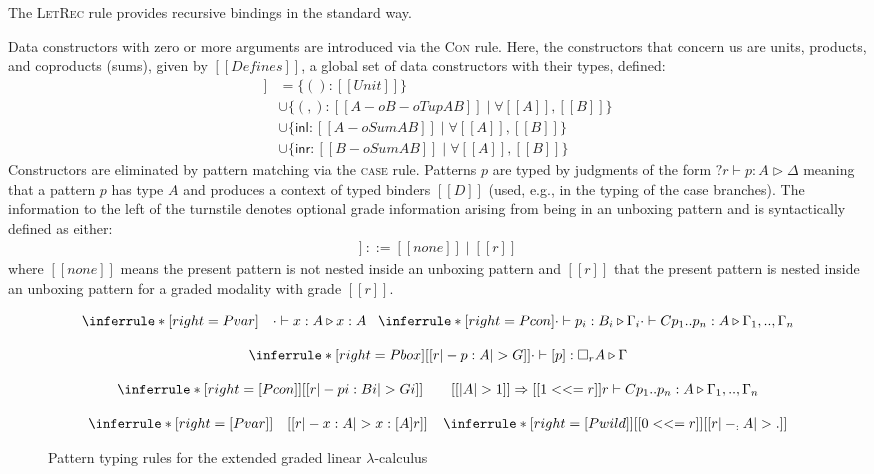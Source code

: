 The \textsc{LetRec} rule provides recursive bindings in the standard
way. 

Data constructors with zero or more arguments are introduced via
the \textsc{Con} rule. Here, the constructors that concern us are
units, products, and coproducts (sums), given by $[[ Defines ]]$,
a global set of data constructors with their types, defined:
%
\begin{align*}
[[ Defines ]] & = \{() : [[ Unit ]]\}\\
& \cup \{(,) : [[ A -o {B -o Tup A B} ]] \mid \forall [[ A ]], [[ B ]] \} \\ 
& \cup \{\mathsf{inl} : [[ A -o Sum A B ]] \mid \forall [[ A ]], [[ B ]] \} \\
& \cup \{\mathsf{inr} : [[ B -o Sum A B ]] \mid \forall [[ A ]], [[ B ]] \}
\end{align*}
%
Constructors are eliminated by pattern matching via the \textsc{case} rule.
Patterns $p$ are typed by judgments of the form $?r \vdash p : A \triangleright
\Delta$ meaning that a pattern $p$ has type $A$ and produces a context of typed
binders $[[ D ]]$ (used, e.g., in the typing of the case branches). The
information to the left of the turnstile denotes optional grade information
arising from being in an unboxing pattern and is syntactically defined as
either:
%
\begin{align*}
[[ CoeffInfo ]]\ ::= [[ none ]] \mid [[ r ]]
\tag{enclosing grade}
\end{align*}
%
 where $[[ none ]]$ means the present pattern is not nested inside an
unboxing pattern and $[[ r ]]$ that the present pattern is nested
inside an unboxing pattern for a graded modality with grade $[[r]]$.

\begin{figure}[t]
\begin{align*}
\setlength{\arraycolsep}{0em}
\begin{array}{ccc}
\inferrule*[right=Pvar]
 {\quad}
 {\cdot \vdash x : A \triangleright x : A}
\;\;\;
\inferrule*[right=Pcon]
{\cdot \vdash p_i : B_i \triangleright \Gamma_i}
{\cdot \vdash C p_1 .. p_n : A \triangleright \Gamma_1, .., \Gamma_n}
\\[1.25em]
\inferrule*[right={Pbox}]
{[[ r |- p : A |> G ]]}
{\cdot \vdash [p] : \Box_r A \triangleright \Gamma }
 \\[1.25em]
\inferrule*[right={[}Pcon{]}]
{[[ r |- pi : Bi |> Gi ]] \quad\quad
[[ |A| > 1 ]] \Rightarrow [[ 1 <<= r ]]}
{r \vdash C p_1 .. p_n : A \triangleright \Gamma_1, .., \Gamma_n}
%
\\[1.25em]
\inferrule*[right={[}Pvar{]}]
 {\quad}
 {[[ r |- x : A |> x : [ A ] { r } ]]}
 \;\;\;\;
\inferrule*[right={[}Pwild{]}]
 {[[ 0 <<= r ]]}
 {[[ r |- _ : A |> . ]]}
\end{array}
\end{align*}
\caption{Pattern typing rules for the extended graded linear $\lambda$-calculus}
\label{fig:deriving-pattern-rules}
\end{figure}

